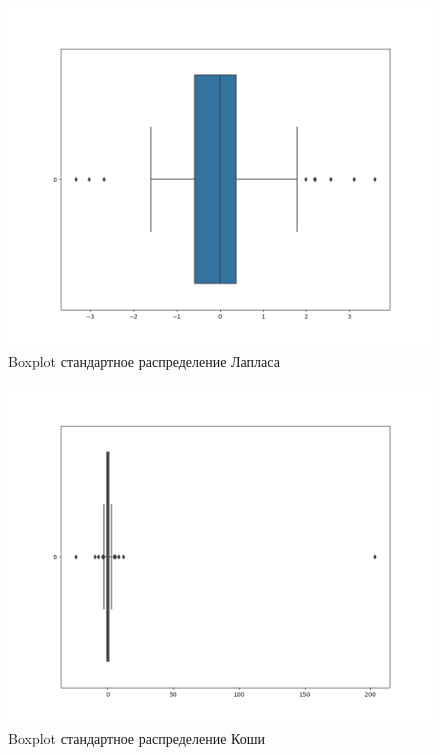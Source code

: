 \documentclass[a4]{article}
\begin{document}
\begin{center}
\begin{figure}[H]
\caption{Boxplot стандартное распределение Лапласа }
\includegraphics[width=\textwidth]{boxplot_N=100_laplace.png} 
\end{figure}

\begin{figure}[H]
\caption{Boxplot стандартное распределение Коши }
\includegraphics[width=\textwidth]{boxplot_N=100_cauchy.png} 
\end{figure}


\end{center}
\end{document}
